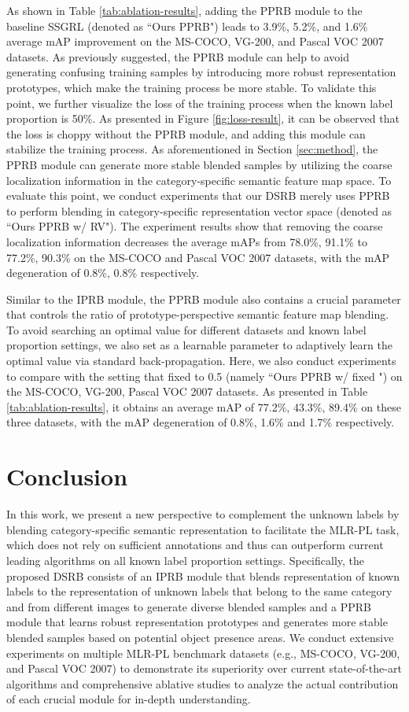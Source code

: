 \documentclass[lettersize,journal]{IEEEtran}
\begin{document}
As shown in Table \ref{tab:ablation-results}, adding the PPRB module to the baseline SSGRL (denoted as ``Ours PPRB") leads to 3.9\%, 5.2\%, and 1.6\% average mAP improvement on the MS-COCO, VG-200, and Pascal VOC 2007 datasets. As previously suggested, the PPRB module can help to avoid generating confusing training samples by introducing more robust representation prototypes, which make the training process be more stable. To validate this point, we further visualize the loss of the training process when the known label proportion is 50\%. As presented in Figure \ref{fig:loss-result}, it can be observed that the loss is choppy without the PPRB module, and adding this module can stabilize the training process. As aforementioned in Section \ref{sec:method}, the PPRB module can generate more stable blended samples by utilizing the coarse localization information in the category-specific semantic feature map space. To evaluate this point, we conduct experiments that our DSRB merely uses PPRB to perform blending in category-specific representation vector space (denoted as ``Ours PPRB w/ RV"). The experiment results show that removing the coarse localization information decreases the average mAPs from 78.0\%, 91.1\% to 77.2\%, 90.3\% on the MS-COCO and Pascal VOC 2007 datasets, with the mAP degeneration of 0.8\%, 0.8\% respectively. 

Similar to the IPRB module, the PPRB module also contains a crucial parameter  that controls the ratio of prototype-perspective semantic feature map blending. To avoid searching an optimal value for different datasets and known label proportion settings, we also set  as a learnable parameter to adaptively learn the optimal value via standard back-propagation. Here, we also conduct experiments to compare with the setting that fixed  to 0.5 (namely ``Ours PPRB w/ fixed ") on the MS-COCO, VG-200, Pascal VOC 2007 datasets. As presented in Table \ref{tab:ablation-results}, it obtains an average mAP of 77.2\%, 43.3\%, 89.4\% on these three datasets, with the mAP degeneration of 0.8\%, 1.6\% and 1.7\% respectively. 

\section{Conclusion} \label{sec:conclusion}
In this work, we present a new perspective to complement the unknown labels by blending category-specific semantic representation to facilitate the MLR-PL task, which does not rely on sufficient annotations and thus can outperform current leading algorithms on all known label proportion settings. Specifically, the proposed DSRB consists of an IPRB module that blends representation of known labels to the representation of unknown labels that belong to the same category and from different images to generate diverse blended samples and a PPRB module that learns robust representation prototypes and generates more stable blended samples based on potential object presence areas. We conduct extensive experiments on multiple MLR-PL benchmark datasets (e.g., MS-COCO, VG-200, and Pascal VOC 2007) to demonstrate its superiority over current state-of-the-art algorithms and comprehensive ablative studies to analyze the actual contribution of each crucial module for in-depth understanding.
\end{document}
